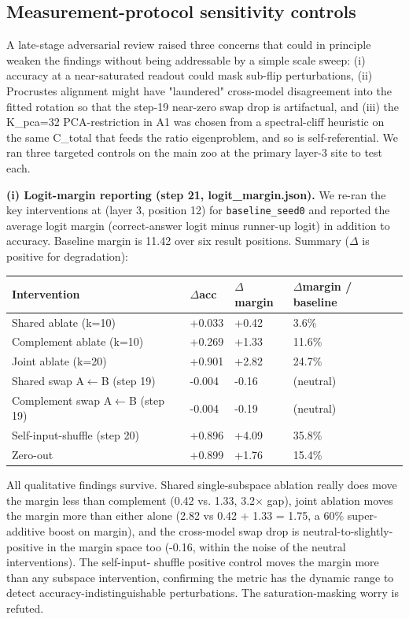 \subsection{Measurement-protocol sensitivity controls}

A late-stage adversarial review raised three concerns that could in
principle weaken the findings without being addressable by a simple scale
sweep: (i) accuracy at a near-saturated readout could mask sub-flip
perturbations, (ii) Procrustes alignment might have "laundered" cross-model
disagreement into the fitted rotation so that the step-19 near-zero swap
drop is artifactual, and (iii) the K\_pca=32 PCA-restriction in A1 was
chosen from a spectral-cliff heuristic on the same C\_total that feeds the
ratio eigenproblem, and so is self-referential. We ran three targeted
controls on the main zoo at the primary layer-3 site to test each.

\textbf{(i) Logit-margin reporting (step 21, logit\_margin.json).}
We re-ran the key interventions at (layer 3, position 12) for
\texttt{baseline\_seed0} and reported the average logit margin (correct-answer
logit minus runner-up logit) in addition to accuracy. Baseline margin is
11.42 over six result positions. Summary ($\Delta$ is positive for degradation):

\begin{center}
\begin{tabular}{|l|l|l|l|}
\hline
\textbf{Intervention} & \textbf{$\Delta$acc} & \textbf{$\Delta$margin} & \textbf{$\Delta$margin / baseline} \\
\hline
Shared ablate (k=10) & +0.033 & +0.42 & 3.6\% \\
Complement ablate (k=10) & +0.269 & +1.33 & 11.6\% \\
Joint ablate (k=20) & +0.901 & +2.82 & 24.7\% \\
Shared swap A$\leftarrow$B (step 19) & -0.004 & -0.16 & (neutral) \\
Complement swap A$\leftarrow$B (step 19) & -0.004 & -0.19 & (neutral) \\
Self-input-shuffle (step 20) & +0.896 & +4.09 & 35.8\% \\
Zero-out & +0.899 & +1.76 & 15.4\% \\
\hline
\end{tabular}
\end{center}


All qualitative findings survive. Shared single-subspace ablation really
does move the margin less than complement (0.42 vs. 1.33, 3.2$\times$ gap),
joint ablation moves the margin more than either alone (2.82 vs 0.42 +
1.33 = 1.75, a 60\% super-additive boost on margin), and the cross-model
swap drop is neutral-to-slightly-positive in the margin space too
(-0.16, within the noise of the neutral interventions). The self-input-
shuffle positive control moves the margin more than any subspace
intervention, confirming the metric has the dynamic range to detect
accuracy-indistinguishable perturbations. The saturation-masking worry
is refuted.

